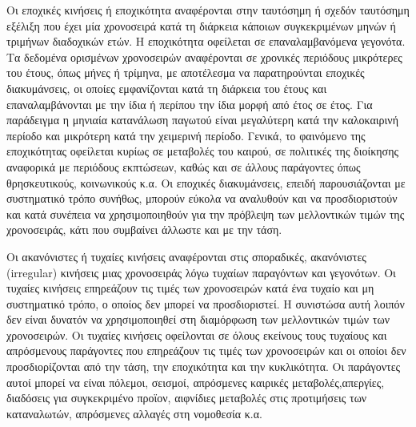 Οι εποχικές κινήσεις ή εποχικότητα αναφέρονται στην ταυτόσημη ή σχεδόν
ταυτόσημη εξέλιξη που έχει μία χρονοσειρά κατά τη διάρκεια κάποιων
συγκεκριμένων μηνών ή τριμήνων διαδοχικών ετών. Η εποχικότητα οφείλεται σε
επαναλαμβανόμενα γεγονότα. Τα δεδομένα ορισμένων χρονοσειρών αναφέρονται σε
χρονικές περιόδους μικρότερες του έτους, όπως μήνες ή τρίμηνα, με αποτέλεσμα να
παρατηρούνται εποχικές διακυμάνσεις, οι οποίες εμφανίζονται κατά τη διάρκεια του
έτους και επαναλαμβάνονται με την ίδια ή περίπου την ίδια μορφή από έτος σε έτος.
Για παράδειγμα η μηνιαία κατανάλωση παγωτού είναι μεγαλύτερη κατά την
καλοκαιρινή περίοδο και μικρότερη κατά την χειμερινή περίοδο. Γενικά, το
φαινόμενο της εποχικότητας οφείλεται κυρίως σε μεταβολές του καιρού, σε πολιτικές
της διοίκησης αναφορικά με περιόδους εκπτώσεων, καθώς και σε άλλους παράγοντες
όπως θρησκευτικούς, κοινωνικούς κ.α. Οι εποχικές διακυμάνσεις, επειδή
παρουσιάζονται με συστηματικό τρόπο συνήθως, μπορούν εύκολα να αναλυθούν και
να προσδιοριστούν και κατά συνέπεια να χρησιμοποιηθούν για την πρόβλεψη των
μελλοντικών τιμών της χρονοσειράς, κάτι που συμβαίνει άλλωστε και με την τάση.

Οι ακανόνιστες ή τυχαίες κινήσεις αναφέρονται στις σποραδικές, ακανόνιστες $\:$ 
 (irregular) κινήσεις μιας χρονοσειράς λόγω τυχαίων παραγόντων και γεγονότων. Οι
τυχαίες κινήσεις επηρεάζουν τις τιμές των χρονοσειρών κατά ένα τυχαίο και μη
συστηματικό τρόπο, ο οποίος δεν μπορεί να προσδιοριστεί. Η συνιστώσα αυτή λοιπόν
δεν είναι δυνατόν να χρησιμοποιηθεί στη διαμόρφωση των μελλοντικών τιμών των
χρονοσειρών. Οι τυχαίες κινήσεις οφείλονται σε όλους εκείνους τους τυχαίους και
απρόσμενους παράγοντες που επηρεάζουν τις τιμές των χρονοσειρών και οι οποίοι
δεν προσδιορίζονται από την τάση, την εποχικότητα και την κυκλικότητα. Οι
παράγοντες αυτοί μπορεί να είναι πόλεμοι, σεισμοί, απρόσμενες καιρικές μεταβολές,απεργίες, διαδόσεις για συγκεκριμένο προϊον, αιφνίδιες μεταβολές στις προτιμήσεις
των καταναλωτών, απρόσμενες αλλαγές στη νομοθεσία κ.α.

